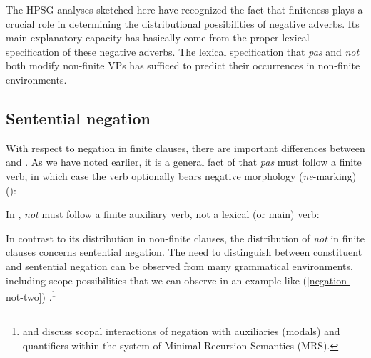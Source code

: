 \documentclass[output=paper
	        ,collection
	        ,collectionchapter
 	        ,biblatex
                ,babelshorthands
                ,newtxmath
                ,draftmode
                ,colorlinks, citecolor=brown
]{langscibook}
\begin{document}
\begin{exe}
\begin{xlist}
\begin{exe}
\begin{xlist}
The HPSG analyses sketched here have recognized
the fact that finiteness plays a crucial role in
determining the distributional possibilities of negative
adverbs. Its main explanatory capacity
has basically come from the proper lexical specification of these negative
adverbs. The lexical specification that \textit{pas} and
\textit{not} both modify non-finite VPs has sufficed to predict their
occurrences in non-finite environments.



\subsection{Sentential negation}
\label{sec-sentential-negation}

With respect to negation in finite clauses, there are important differences between  and .
As we have noted earlier, it is a general fact of  that \textit{pas} must follow a finite verb, in which case the verb optionally bears negative morphology (\textit{ne}-marking) (\citealp[]{KS:02}):

\eal
{}
\zl
\noindent
In , \textit{not} must follow a finite
auxiliary verb, not a lexical (or main) verb:

\eal
{}
\zl

In contrast to its distribution
in non-finite clauses, the distribution
of \textit{not}
 in finite clauses concerns sentential
 negation.
  The need to distinguish between constituent and sentential negation can be
  observed from
  many grammatical environments, including scope
possibilities that we can observe in an example like (\ref{negation-not-two}) \parencites(see){Klima:64}{Baker:91}{Warner2000a-u}[]{kimmichaelis:2020}.\footnote{\citet{Warner2000a-u} and \citet{BL:13}
discuss scopal interactions of negation with auxiliaries (modals) and quantifiers
within the system of Minimal Recursion Semantics (MRS).}


\end{xlist}
\end{exe}
\end{xlist}
\end{exe}
\end{document}
